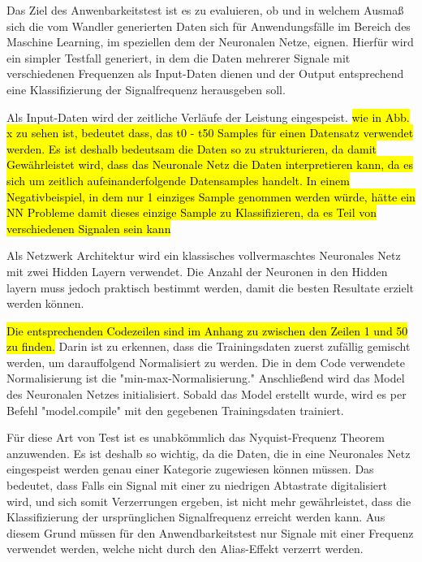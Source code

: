 Das Ziel des Anwenbarkeitstest ist es zu evaluieren, ob und in welchem Ausmaß sich die vom Wandler generierten Daten sich für Anwendungsfälle im Bereich des Maschine Learning, im speziellen dem der Neuronalen Netze, eignen. Hierfür wird ein simpler Testfall generiert, in dem die Daten mehrerer Signale mit verschiedenen Frequenzen als Input-Daten dienen und der Output entsprechend eine Klassifizierung der Signalfrequenz herausgeben soll.

Als Input-Daten wird der zeitliche Verläufe der Leistung eingespeist. \hl{wie in Abb. x zu sehen ist, bedeutet dass, das t0 - t50 Samples für einen Datensatz verwendet werden. Es ist deshalb bedeutsam die Daten so zu strukturieren, da damit Gewährleistet wird, dass das Neuronale Netz die Daten interpretieren kann, da es sich um zeitlich aufeinanderfolgende Datensamples handelt. In einem Negativbeispiel, in dem nur 1 einziges Sample genommen werden würde, hätte ein NN Probleme damit dieses einzige Sample zu Klassifizieren, da es Teil von verschiedenen Signalen sein kann}

Als Netzwerk Architektur wird ein klassisches vollvermaschtes Neuronales Netz mit zwei Hidden Layern verwendet. Die Anzahl der Neuronen in den Hidden layern muss jedoch praktisch bestimmt werden, damit die besten Resultate erzielt werden können.

\hl{Die entsprechenden Codezeilen sind im Anhang zu zwischen den Zeilen 1 und 50 zu finden.} Darin ist zu erkennen, dass die Trainingsdaten zuerst zufällig gemischt werden, um darauffolgend Normalisiert zu werden. Die in dem Code verwendete Normalisierung ist die "min-max-Normalisierung."  Anschließend wird das Model des Neuronalen Netzes initialisiert. Sobald das Model erstellt wurde, wird es per Befehl "model.compile" mit den gegebenen Trainingsdaten trainiert.


 
Für diese Art von Test ist es unabkömmlich das Nyquist-Frequenz Theorem anzuwenden.  Es ist deshalb so wichtig, da die Daten, die in eine Neuronales Netz eingespeist werden genau einer Kategorie zugewiesen können müssen. Das bedeutet, dass Falls ein Signal mit einer zu niedrigen Abtastrate digitalisiert wird, und sich somit Verzerrungen ergeben, ist nicht mehr gewährleistet, dass die Klassifizierung der ursprünglichen Signalfrequenz erreicht werden kann. Aus diesem Grund müssen für den Anwendbarkeitstest nur Signale mit einer Frequenz verwendet werden, welche nicht durch den Alias-Effekt verzerrt werden.


